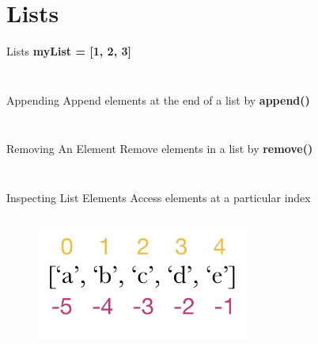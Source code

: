     \section{Lists}
        \begin{frame}{Lists}
                \Huge {\textbf{myList = [1, 2, 3]}}
                \pause  
                \inputminted[frame=single,framesep=2pt]{python3}{code-examples/intro_lists.py}
                \pause  
                \inputminted[frame=single,framesep=2pt]{python3}{code-examples/mixed_list.py}
        \end{frame}
        \begin{frame}{Appending}
            Append elements at the end of a list by \textbf{append()}
            \bigskip
            \inputminted[frame=single,framesep=2pt]{python3}{code-examples/append_list.py}
            \pause  
            \inputminted[frame=single,framesep=2pt]{python3}{code-examples/append_list2.py}
        \end{frame}
        \begin{frame}{Removing An Element}
            Remove elements in a list by \textbf{remove()}
            \bigskip
            \inputminted[frame=single,framesep=2pt]{python3}{code-examples/remove.py}
            \pause  
            \inputminted[frame=single,framesep=2pt]{python3}{code-examples/remove2.py}
        \end{frame}
        \begin{frame}{Inspecting List Elements}
            Access elements at a particular index
            \begin{columns}
               \begin{column}{0.5\textwidth}
                \vspace{-5mm}
                \begin{figure}[H]
                    \bigskip
                    \includegraphics[width=70mm]{code-examples/index.png}
                    \end{figure}    
               \end{column}
              \pause 
               \begin{column}{0.5\textwidth}
                \inputminted[frame=single,framesep=2pt]{python3}{code-examples/index.py}
               \end{column} 
            \end{columns}
        \end{frame}

